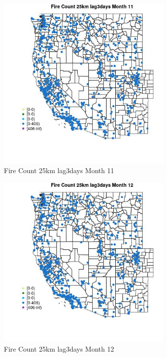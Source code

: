 \begin{figure} 
\centering  
\includegraphics[width=0.77\textwidth]{Code_Outputs/Report_ML_input_PM25_Step4_part_f_de_duplicated_aveswNAs_MapObsMo11Fire_Count_25km_lag3days.jpg} 
\caption{\label{fig:Report_ML_input_PM25_Step4_part_f_de_duplicated_aveswNAsMapObsMo11Fire_Count_25km_lag3days}Fire Count 25km lag3days Month 11} 
\end{figure} 
 

\begin{figure} 
\centering  
\includegraphics[width=0.77\textwidth]{Code_Outputs/Report_ML_input_PM25_Step4_part_f_de_duplicated_aveswNAs_MapObsMo12Fire_Count_25km_lag3days.jpg} 
\caption{\label{fig:Report_ML_input_PM25_Step4_part_f_de_duplicated_aveswNAsMapObsMo12Fire_Count_25km_lag3days}Fire Count 25km lag3days Month 12} 
\end{figure} 
 

